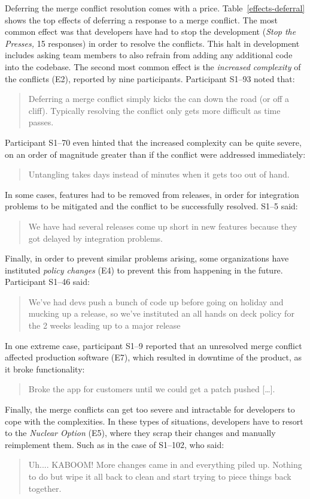 Deferring the merge conflict resolution comes with a price.
Table~\ref{effects-deferral} shows the top effects of deferring a response to a merge conflict.
The most common effect was that developers have had to stop the development (\emph{Stop the Presses,} 15 responses) in order to resolve the conflicts.
This halt in development includes asking team members to also refrain from adding any additional code into the codebase.
The second most common effect is the \textit{increased complexity} of the conflicts (E2), reported by nine participants.
Participant S1--93 noted that:
\begin{quotation}
	Deferring a merge conflict simply kicks the can down the road (or off a cliff). Typically resolving the conflict only gets more difficult as time passes.
\end{quotation}
Participant S1--70 even hinted that the increased complexity can be quite severe, on an order of magnitude greater than if the conflict were addressed immediately:
\begin{quotation}
	Untangling takes days instead of minutes when it gets too out of hand.
\end{quotation}
In some cases, features had to be removed from releases, in order for integration problems to be mitigated and the conflict to be successfully resolved. S1--5 said:
\begin{quotation}
	We have had several releases come up short in new features because they got delayed by integration problems.
\end{quotation}
Finally, in order to prevent similar problems arising, some organizations have instituted \textit{policy changes} (E4) to prevent this from happening in the future. Participant S1--46 said:
\begin{quotation}
	We've had devs push a bunch of code up before going on holiday and mucking up a release, so we've instituted an all hands on deck policy for the 2 weeks leading up to a major release
\end{quotation}

In one extreme case, participant S1--9 reported that an unresolved merge conflict affected production software (E7), which resulted in downtime of the product, as it broke functionality:
\begin{quotation}
	Broke the app for customers until we could get a patch pushed [\ldots].
\end{quotation}
Finally, the merge conflicts can get too severe and intractable for developers to cope with the complexities.
In these types of situations, developers have to resort to the \emph{Nuclear Option} (E5), where they scrap their changes and manually reimplement them.
Such as in the case of S1--102, who said:
\begin{quotation}
	Uh.... KABOOM! More changes came in and everything piled up. Nothing to do but wipe it all back to clean and start trying to piece things back together.
\end{quotation}

